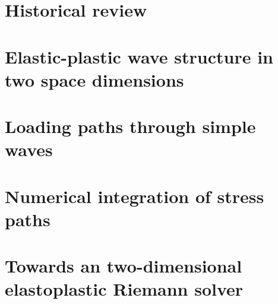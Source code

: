 \section{Historical review}
\label{sec:review}


\section{Elastic-plastic wave structure in two space dimensions}
\label{sec:charac_plast}


\section{Loading paths through simple waves}
\label{sec:stress_paths}



\section{Numerical integration of stress paths}
\label{sec:stress_paths_num}


\section{Towards an two-dimensional elastoplastic Riemann solver}
\label{sec:ep_Riemman_solver}


